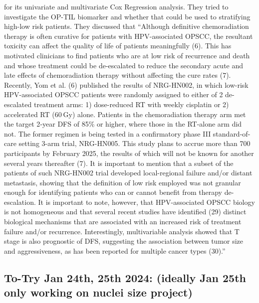 \documentclass{article}%
\begin{document}
 for its univariate and multivariate Cox Regression analysis. They tried to investigate the OP{-}TIL biomarker and whether that could be used to stratifying high{-}low risk patients. They discussed that “Although definitive chemoradiation therapy is often curative for patients with HPV{-}associated OPSCC, the resultant toxicity can affect the quality of life of patients meaningfully (6). This has motivated clinicians to find patients who are at low risk of recurrence and death and whose treatment could be de{-}escalated to reduce the secondary acute and late effects of chemoradiation therapy without affecting the cure rates (7). Recently, Yom et al. (6) published the results of NRG{-}HN002, in which low{-}risk HPV{-}associated OPSCC patients were randomly assigned to either of 2 de{-}escalated treatment arms: 1) dose{-}reduced RT with weekly cisplatin or 2) accelerated RT (60 Gy) alone. Patients in the chemoradiation therapy arm met the target 2{-}year DFS of 85\% or higher, where those in the RT{-}alone arm did not. The former regimen is being tested in a confirmatory phase III standard{-}of{-}care setting 3{-}arm trial, NRG{-}HN005. This study plans to accrue more than 700 participants by February 2025, the results of which will not be known for another several years thereafter (7). It is important to mention that a subset of the patients of such NRG{-}HN002 trial developed local{-}regional failure and/or distant metastasis, showing that the definition of low risk employed was not granular enough for identifying patients who can or cannot benefit from therapy de{-}escalation. It is important to note, however, that HPV{-}associated OPSCC biology is not homogeneous and that several recent studies have identified (29) distinct biological mechanisms that are associated with an increased risk of treatment failure and/or recurrence. Interestingly, multivariable analysis showed that T stage is also prognostic of DFS, suggesting the association between tumor size and aggressiveness, as has been reported for multiple cancer types (30).”%
\newline%
\newline%
%
\subsection{To{-}Try Jan 24th, 25th  2024: (ideally Jan 25th only working on nuclei size project)  }%
\label{subsec:To{-}TryJan24th,25th2024(ideallyJan25thonlyworkingonnucleisizeproject)}%
\end{document}
